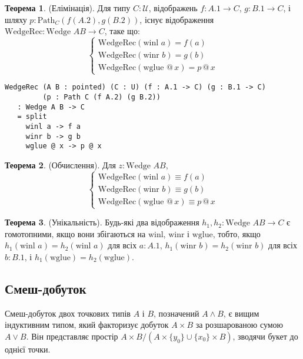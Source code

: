 \documentclass{article}
\theoremstyle{definition}
\newtheorem{theorem}{Теорема}
\begin{document}
\begin{theorem} (Елімінація).
Для типу \( C : \mathcal{U} \), відображень \( f : A.1 \to C \), \( g : B.1 \to C \), і шляху \( p : \text{Path}_C (f (A.2), g (B.2)) \), існує відображення \( \text{WedgeRec} : \text{Wedge } A B \to C \), таке що:
\[
\begin{cases}
\text{WedgeRec}(\text{winl } a) = f(a) \\
\text{WedgeRec}(\text{winr } b) = g(b) \\
\text{WedgeRec}(\text{wglue } @ \, x) = p \, @ \, x
\end{cases}
\]
\begin{lstlisting}
WedgeRec (A B : pointed) (C : U) (f : A.1 -> C) (g : B.1 -> C)
         (p : Path C (f A.2) (g B.2))
   : Wedge A B -> C
   = split
     winl a -> f a
     winr b -> g b
     wglue @ x -> p @ x
\end{lstlisting}
\end{theorem}

\begin{theorem} (Обчислення).
Для \( z : \text{Wedge } A B \),
\[
\begin{cases}
\text{WedgeRec}(\text{winl } a) \equiv f(a) \\
\text{WedgeRec}(\text{winr } b) \equiv g(b) \\
\text{WedgeRec}(\text{wglue } @ \, x) \equiv p \, @ \, x
\end{cases}
\]
\end{theorem}

\begin{theorem} (Унікальність).
Будь-які два відображення \( h_1, h_2 : \text{Wedge } A B \to C \) є гомотопними, якщо
вони збігаються на \( \text{winl} \), \( \text{winr} \) і \( \text{wglue} \),
тобто, якщо \( h_1(\text{winl } a) = h_2(\text{winl } a) \) для
всіх \( a : A.1 \), \( h_1(\text{winr } b) = h_2(\text{winr } b) \) для
всіх \( b : B.1 \), і \( h_1(\text{wglue}) = h_2(\text{wglue}) \).
\end{theorem}

\newpage
\subsection{Смеш-добуток}
Смеш-добуток двох точкових типів \( A \) і \( B \), позначений \( A \wedge B \),
є вищим індуктивним типом, який факторизує добуток \( A \times B \) за
розшарованою сумою \( A \vee B \). Він представляє простір \( A \times B / (A \times \{ y_0 \} \cup \{ x_0 \} \times B) \),
зводячи букет до однієї точки.
\end{document}
